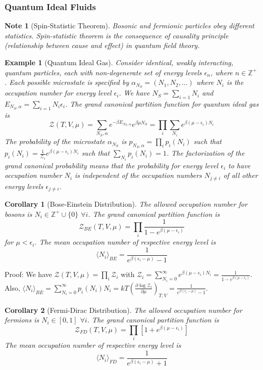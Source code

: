 \documentclass[a4paper]{article}
\newtheorem{eg}{Example}[section]
\newtheorem{Note}{Note}[section]
\theoremstyle{new}
\newtheorem{cor}{Corollary}[section]
\begin{document}
\subsubsection*{Quantum Ideal Fluids}
\begin{Note}[Spin-Statistic Theorem]
Bosonic and fermionic particles obey different statistics. Spin-statistic theorem is the consequence of causality principle (relationship between cause and effect) in quantum field theory. 
\end{Note}
\begin{eg}[Quantum Ideal Gas]
Consider identical, weakly interacting, quantum particles, each with non-degenerate set of energy levels $\epsilon_n$, where $n\in\mathbb{Z}^+$. Each possible microstate is specified by $\alpha_{N_S}=(N_1,N_2,...)$ where $N_i$ is the occupation number for energy level $\epsilon_i$. We have $N_S=\sum_{i=1}N_i$ and $E_{N_S,\alpha}=\sum_{i=1}N_i\epsilon_i$. The grand canonical partition function for quantum ideal gas is
$$\mathcal{Z}(T,V,\mu)=\sum_{N_S,\alpha}e^{-\beta E_{N_S,\alpha}}e^{\beta\mu N_S}=\prod_i\sum_{N_i}e^{\beta(\mu-\epsilon_i)N_i}$$
The probability of the microstate $\alpha_{N_S}$ is $p_{N_S,\alpha}=\prod_ip_i(N_i)$ such that $p_i(N_i)=\frac{1}{\mathcal{Z}_i}e^{\beta(\mu-\epsilon_i)N_i}$ such that $\sum_{N_i}p_i(N_i)=1$. The factorization of the grand canonical probability means that the probability for energy level $\epsilon_i$ to have occupation number $N_i$ is independent of the occupation numbers $N_{j\neq i}$ of all other energy levels $\epsilon_{j\neq i}$.
\end{eg}
\begin{cor}[Bose-Einstein Distribution]
The allowed occupation number for bosons is $N_i\in\mathbb{Z}^+\cup\{0\}$ $\forall i$. The grand canonical partition function is
$$\mathcal{Z}_{BE}(T,V,\mu)=\prod_i\frac{1}{1-e^{\beta(\mu-\epsilon_i)}}$$
for $\mu<\epsilon_i$. The mean occupation number of respective energy level is
$$\langle N_i\rangle_{BE}=\frac{1}{e^{\beta(\epsilon_i-\mu)}-1}$$
\end{cor}
Proof: We have $\mathcal{Z}(T,V,\mu)=\prod_i\mathcal{Z}_i$ with $\mathcal{Z}_i=\sum_{N_i=0}^\infty e^{\beta(\mu-\epsilon_i)N_i}=\frac{1}{1-e^{\beta(\mu-\epsilon_i)}}$. Also, $\langle N_i\rangle_{BE}=\sum_{N_i=0}^\infty p_i(N_i)N_i=kT(\frac{\partial\log\mathcal{Z}_i}{\partial\mu})_{T,V}=\frac{1}{e^{\beta(\epsilon_i-\mu)}-1}$.
\begin{cor}[Fermi-Dirac Distribution]
The allowed occupation number for fermions is $N_i\in[0,1]$ $\forall i$. The grand canonical partition function is
$$\mathcal{Z}_{FD}(T,V,\mu)=\prod_i[1+e^{\beta(\mu-\epsilon_i)}]$$
The mean occupation number of respective energy level is
$$\langle N_i\rangle_{FD}=\frac{1}{e^{\beta(\epsilon_i-\mu)}+1}$$
\end{cor}
\end{document}
